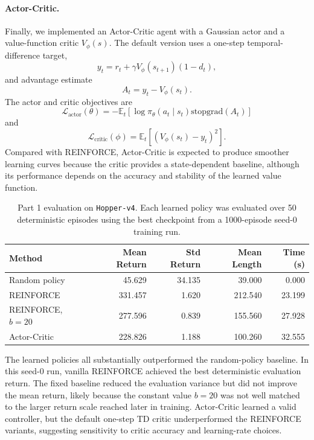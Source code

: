 \paragraph{Actor-Critic.}
Finally, we implemented an Actor-Critic agent with a Gaussian actor and a value-function critic $V_\phi(s)$. The default version uses a one-step temporal-difference target,
\begin{equation}
y_t = r_t + \gamma V_\phi(s_{t+1})(1-d_t),
\end{equation}
and advantage estimate
\begin{equation}
A_t = y_t - V_\phi(s_t).
\end{equation}
The actor and critic objectives are
\begin{equation}
\mathcal{L}_{\mathrm{actor}}(\theta)
= -\mathbb{E}_t[\log \pi_\theta(a_t \mid s_t)\mathrm{stopgrad}(A_t)]
\end{equation}
and
\begin{equation}
\mathcal{L}_{\mathrm{critic}}(\phi)
= \mathbb{E}_t[(V_\phi(s_t)-y_t)^2].
\end{equation}
Compared with REINFORCE, Actor-Critic is expected to produce smoother learning curves because the critic provides a state-dependent baseline, although its performance depends on the accuracy and stability of the learned value function.

\begin{table}[t]
\centering
\caption{Part 1 evaluation on \texttt{Hopper-v4}. Each learned policy was evaluated over 50 deterministic episodes using the best checkpoint from a 1000-episode seed-0 training run.}
\label{tab:part1_results}
\begin{tabular}{lrrrr}
\hline
Method & Mean Return & Std Return & Mean Length & Time (s) \\
\hline
Random policy & 45.629 & 34.135 & 39.000 & 0.000 \\
REINFORCE & 331.457 & 1.620 & 212.540 & 23.199 \\
REINFORCE, $b=20$ & 277.596 & 0.839 & 155.560 & 27.928 \\
Actor-Critic & 228.826 & 1.188 & 100.260 & 32.555 \\
\hline
\end{tabular}
\end{table}

The learned policies all substantially outperformed the random-policy baseline. In this seed-0 run, vanilla REINFORCE achieved the best deterministic evaluation return. The fixed baseline reduced the evaluation variance but did not improve the mean return, likely because the constant value $b=20$ was not well matched to the larger return scale reached later in training. Actor-Critic learned a valid controller, but the default one-step TD critic underperformed the REINFORCE variants, suggesting sensitivity to critic accuracy and learning-rate choices.

